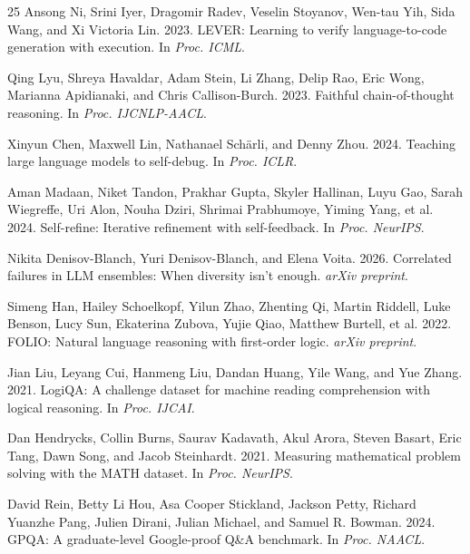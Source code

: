 \documentclass[11pt,a4paper]{article}
\begin{document}
\begin{thebibliography}{25}
Ansong Ni, Srini Iyer, Dragomir Radev, Veselin Stoyanov, Wen-tau Yih, Sida Wang, and Xi Victoria Lin. 2023.
LEVER: Learning to verify language-to-code generation with execution.
In \emph{Proc. ICML}.

Qing Lyu, Shreya Havaldar, Adam Stein, Li Zhang, Delip Rao, Eric Wong, Marianna Apidianaki, and Chris Callison-Burch. 2023.
Faithful chain-of-thought reasoning.
In \emph{Proc. IJCNLP-AACL}.

Xinyun Chen, Maxwell Lin, Nathanael Sch\"{a}rli, and Denny Zhou. 2024.
Teaching large language models to self-debug.
In \emph{Proc. ICLR}.

Aman Madaan, Niket Tandon, Prakhar Gupta, Skyler Hallinan, Luyu Gao, Sarah Wiegreffe, Uri Alon, Nouha Dziri, Shrimai Prabhumoye, Yiming Yang, et al. 2024.
Self-refine: Iterative refinement with self-feedback.
In \emph{Proc. NeurIPS}.

Nikita Denisov-Blanch, Yuri Denisov-Blanch, and Elena Voita. 2026.
Correlated failures in LLM ensembles: When diversity isn't enough.
\emph{arXiv preprint}.

Simeng Han, Hailey Schoelkopf, Yilun Zhao, Zhenting Qi, Martin Riddell, Luke Benson, Lucy Sun, Ekaterina Zubova, Yujie Qiao, Matthew Burtell, et al. 2022.
FOLIO: Natural language reasoning with first-order logic.
\emph{arXiv preprint}.

Jian Liu, Leyang Cui, Hanmeng Liu, Dandan Huang, Yile Wang, and Yue Zhang. 2021.
LogiQA: A challenge dataset for machine reading comprehension with logical reasoning.
In \emph{Proc. IJCAI}.

Dan Hendrycks, Collin Burns, Saurav Kadavath, Akul Arora, Steven Basart, Eric Tang, Dawn Song, and Jacob Steinhardt. 2021.
Measuring mathematical problem solving with the MATH dataset.
In \emph{Proc. NeurIPS}.

David Rein, Betty Li Hou, Asa Cooper Stickland, Jackson Petty, Richard Yuanzhe Pang, Julien Dirani, Julian Michael, and Samuel R. Bowman. 2024.
GPQA: A graduate-level Google-proof Q\&A benchmark.
In \emph{Proc. NAACL}.

\end{thebibliography}
\end{document}

